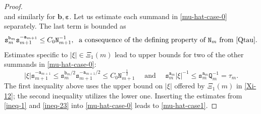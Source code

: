 \documentclass[12pt, twoside]{article}
\theoremstyle{definition}
\numberwithin{equation}{section}
\begin{document}
\begin{proof}
\[ %
 \] 
and similarly for $\mathbf b, \pmb{\varepsilon}$. 
\vskip0.1in
\noindent Let us estimate each summand in \eqref{mu-hat-case-0} separately. The last term is bounded as 
 \begin{equation} \mathtt s_{m}^{\mathtt b_{m}} \mathtt s_{m+1}^{-\mathtt a_{m+1}} \leq C_0 \mathtt N_{m+1}^{-1}, \; \text{ a consequence of the defining property of $\mathtt N_{m}$ from \eqref{Qtau}}. \label{ineq-1} \end{equation} 
Estimates specific to  $|\xi| \in \Xi_1(m)$ lead to upper bounds for two of the other summands in \eqref{mu-hat-case-0}:  
\begin{equation} |\xi| \mathtt s_{m+1}^{-\mathtt a_{m+1}} \leq \mathtt s_{m}^{\mathtt b_{m}/2}  \mathtt s_{m+1}^{-\mathtt a_{m+1}/2} \leq C_0 \mathtt N_{m+1}^{-\frac{1}{2}} \quad \text{ and } \quad \mathtt s_{m}^{\mathtt a_{m}} |\xi|^{-1} \leq \mathtt s_{m}^{\mathtt a_{m}} \mathtt Q_{m}^{-1} = \tau_{m}. \label{ineq-23}  \end{equation} 
The first inequality above uses the upper bound on $|\xi|$ offered by $\Xi_1(m)$ in \eqref{Xi-12}; the second inequality utilizes the lower one.  Inserting the estimates from \eqref{ineq-1} and \eqref{ineq-23} into \eqref{mu-hat-case-0} leads to \eqref{mu-hat-case1}.
\end{proof} 
\end{document}
